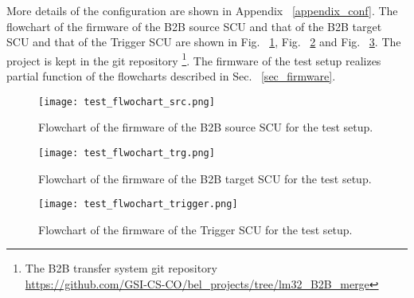 More details of the configuration are shown in Appendix ~\ref{appendix_conf}. The flowchart of the firmware of the B2B source SCU and that of the B2B target SCU and that of the Trigger SCU are shown in Fig. ~\ref{test_flwochart}, Fig. ~\ref{test_flwochart1} and Fig. ~\ref{test_flwochart2}. The project is kept in the git repository \footnote{The B2B transfer system git repository \\ \url{https://github.com/GSI-CS-CO/bel_projects/tree/lm32_B2B_merge}}. The firmware of the test setup realizes partial function of the flowcharts described in Sec. ~\ref{sec_firmware}.
\begin{figure}[H]
   \centering   
   \texttt{[image: test\_flwochart\_src.png]}
   \caption{Flowchart of the firmware of the B2B source SCU for the test setup.}
   \label{test_flwochart}
\end{figure}
\begin{figure}[H]
   \centering   
   \texttt{[image: test\_flwochart\_trg.png]}
   \caption{Flowchart of the firmware of the B2B target SCU for the test setup.}
   \label{test_flwochart1}
\end{figure}
\begin{figure}[H]
   \centering   
   \texttt{[image: test\_flwochart\_trigger.png]}
   \caption{Flowchart of the firmware of the Trigger SCU for the test setup.}
   \label{test_flwochart2}
\end{figure}


